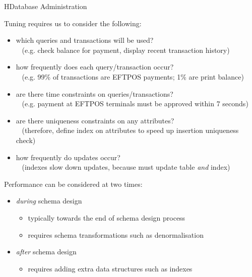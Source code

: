 \begin{lecture}{H}{Database Administration}
\begin{slide}
Tuning requires us to consider the following:
\begin{itemize}
\item which queries and transactions will be used? \\
	~ {\small (e.g. check balance for payment, display recent transaction history)}
\item how frequently does each query/transaction occur? \\
	~ {\small (e.g. 99\% of transactions are EFTPOS payments; 1\% are print balance)}
\item are there time constraints on queries/transactions? \\
	~ {\small (e.g. payment at EFTPOS terminals must be approved within 7 seconds)}
\item are there uniqueness constraints on any attributes? \\
	~ {\small (therefore, define index on attributes to speed up insertion uniqueness check)}
\item how frequently do updates occur? \\
	~ {\small (indexes slow down updates, because must update table {\it{and}} index)}
\end{itemize}
\end{slide}

\begin{slide}
Performance can be considered at two times:
\begin{itemize}
\item {\it{during}} schema design
\begin{itemize}
\item typically towards the end of schema design process
\item requires schema transformations such as denormalisation
\end{itemize}
\item {\it{after}} schema design
\begin{itemize}
\item requires adding extra data structures such as indexes
\end{itemize}
\end{itemize}
\end{slide}


\end{lecture}
